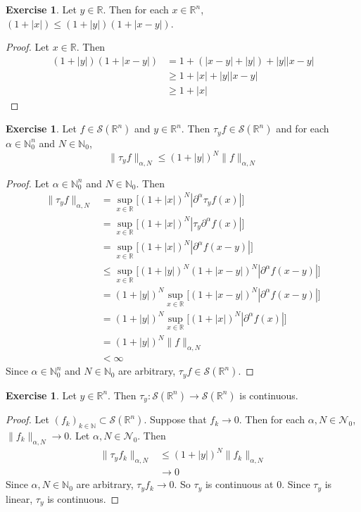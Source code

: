 \documentclass{book}
\theoremstyle{definition}
\newtheorem{ex}[definition]{Exercise}
\newcommand{\al}{\alpha}
\newcommand{\N}{\mathbb{N}}
\newcommand{\R}{\mathbb{R}}
\newcommand{\MN}{\mathcal{N}}
\newcommand{\MS}{\mathcal{S}}
\DeclareMathOperator*{\0}{\mbf{0}}
\DeclareMathOperator*{\1}{\mbf{1}}
\newcommand{\p}{\partial}
\begin{document}
	\begin{ex} 
		Let $y \in \R$. Then for each $x \in \R^n$,  $(1+|x|) \leq (1 + |y|)(1+ |x-y|)$.
	\end{ex}

	\begin{proof}
		Let $x \in \R$. Then 
		\begin{align*}
			(1 + |y|)(1+ |x-y|) 
			& = 1 + (|x-y| + |y|) + |y||x-y| \\
			& \geq 1 + |x| + |y||x-y| \\
			& \geq 1 + |x| 
		\end{align*}
	\end{proof}

	\begin{ex}
		Let $f \in \MS(\R^n)$ and $y \in \R^n$. Then $\tau_y f \in \MS(\R^n)$ and for each $\al \in \N_0^n$ and $N \in \N_0$, 
		$$\|\tau_yf\|_{\al, N} \leq (1 + |y|)^N \|f\|_{\al, N}$$
	\end{ex}

	\begin{proof}
		Let $\al \in \N_0^n$ and $N \in \N_0$. Then 
		\begin{align*}
			\|\tau_y f\|_{\al, N}
			& = \sup_{x \in \R} \bigg[ (1+|x|)^N |\p^{\al} \tau_yf(x)|\bigg] \\
			& =  \sup_{x \in \R} \bigg[ (1+|x|)^N | \tau_y\p^{\al} f(x)|\bigg] \\ 
			& =  \sup_{x \in \R} \bigg[ (1+|x|)^N |\p^{\al} f(x - y)|\bigg] \\ 
			& \leq \sup_{x \in \R} \bigg[ (1+|y|)^N(1 + |x -y|)^N |\p^{\al} f(x - y)|\bigg] \\ 
			& = (1+|y|)^N\sup_{x \in \R} \bigg[ (1 + |x -y|)^N |\p^{\al} f(x - y)|\bigg] \\ 
			& = (1+|y|)^N\sup_{x \in \R} \bigg[ (1 + |x|)^N |\p^{\al} f(x)|\bigg] \\ 
			& = (1+|y|)^N \|f\|_{\al, N} \\ 
			& < \infty
		\end{align*}
		Since $\al \in \N_0^n$ and $N \in \N_0$ are arbitrary, $\tau_y f \in \MS(\R^n)$.
	\end{proof}

	\begin{ex}
		Let $y \in \R^n$. Then $\tau_y: \MS(\R^n) \rightarrow \MS(\R^n)$ is continuous.
	\end{ex}

	\begin{proof} 
		Let $(f_k)_{k \in \N} \subset \MS(\R^n)$. Suppose that $f_k \rightarrow 0$. Then for each $\al,N \in \MN_0$, $\|f_k\|_{\al, N} \rightarrow 0$. 
		Let $\al,N \in \MN_0$. Then 
		\begin{align*}
			\|\tau_yf_k\|_{\al, N} 
			& \leq (1 + |y|)^N\|f_k\|_{\al, N} \\
			& \rightarrow 0
		\end{align*}
		Since $\al, N \in \N_0$ are arbitrary, $\tau_yf_k \rightarrow 0$. So $\tau_y$  is continuous at $0$. Since $\tau_y$ is linear, $\tau_y$ is continuous.
	\end{proof}
\end{document}
